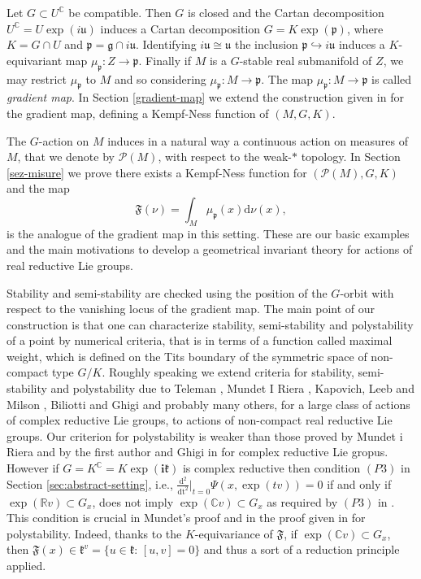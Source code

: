 \documentclass[leqno,11pt, a4]{amsart}
\theoremstyle{named}
\begin{document}
Let $G \subset U^{\mathbb{C}}$ be compatible. Then $G$ is closed and the Cartan decomposition $U^{\mathbb{C}} =U\exp (i {\mathfrak{u}})$ induces a Cartan decomposition $G=K\exp ({\mathfrak{p}})$, where $K=G\cap U$ and ${\mathfrak{p}}={\mathfrak{g}}\cap i {\mathfrak{u}}$.
Identifying $i{\mathfrak{u}} \cong {\mathfrak{u}}$ the inclusion ${\mathfrak{p}} \hookrightarrow i{\mathfrak{u}}$ induces a $K$-equivariant map ${\mu_{\mathfrak{p}}}:Z {\longrightarrow} {\mathfrak{p}}$. Finally if $M$ is a $G$-stable real submanifold of $Z$, we may restrict ${\mu_{\mathfrak{p}}}$ to $M$ and so considering ${\mu_{\mathfrak{p}}}:M {\longrightarrow} {\mathfrak{p}}$. The map ${\mu_{\mathfrak{p}}}:M {\longrightarrow} {\mathfrak{p}}$ is called \emph{gradient map}. In Section \ref{gradient-map} we extend the construction given in \cite{mundet-Crelles}  for the gradient map, defining a Kempf-Ness function of $(M,G,K)$.

The $G$-action on $M$ induces in a natural way a continuous action on measures of $M$, that we denote by $\mathcal P (M)$, with respect to the weak-$\ast$ topology. In Section \ref{sez-misure} we prove there exists a Kempf-Ness function for $(\mathcal P (M),G,K)$ and the map
\[
{\mathfrak{F}} (\nu)=\int_M {\mu_{\mathfrak{p}}}(x) \mathrm d \nu (x),
\]
is the analogue of the gradient map in this setting.
These are our  basic examples and the main motivations  to develop a geometrical invariant theory for actions of real reductive Lie groups.

Stability and semi-stability are checked using the position of the  $G$-orbit with respect to the vanishing locus of the gradient map.
The main point of our construction is that one can characterize stability, semi-stability and polystability of a point by numerical criteria, that is in terms of a function called maximal
weight, which is defined on the Tits boundary of the symmetric space of non-compact type $G/K$.  Roughly speaking we extend criteria for stability, semi-stability and polystability due to Teleman \cite{teleman-symplectic-stability}, Mundet I Riera \cite{mundet-Crelles, mundet-Trans}, Kapovich, Leeb and Milson \cite{kapovich-leeb-millson-convex-JDG}, Biliotti and Ghigi \cite{bgs} and probably many others, for a large class of  actions of complex reductive Lie groups,  to actions of non-compact real reductive Lie groups. Our  criterion for polystability is weaker than those proved by Mundet i Riera \cite{mundet-Trans} and by the first author and Ghigi in \cite{bgs} for complex reductive Lie gropus. However if $G=K^{\mathbb{C}}=K\exp(\mathbf{i} {\mathfrak{k}})$ is complex reductive then condition $(P3)$ in Section \ref{sec:abstract-setting}, i.e.,   $\frac{\mathrm{d^2}}{\mathrm{dt}^2 }\bigg \vert_{t=0}\Psi(x,\exp(t{{v}})) =0$
if and only if $\exp({\mathbb{R}} {{v}}) \subset G_x$, does not imply $\exp ({\mathbb{C}} {{v}}) \subset G_x$ as required by $(P3)$ in \cite[p. 6]{bgs}. 
 This condition is crucial in Mundet's proof \cite{mundet-Trans} and in the proof given in \cite{bgs} for polystability. Indeed, thanks to the $K$-equivariance of  ${\mathfrak{F}}$, if $\exp ({\mathbb{C}} {{v}}) \subset G_x$, then  ${\mathfrak{F}} (x) \in {\mathfrak{k}}^{{v}}=\{u\in {\mathfrak{k}}:\, [u,{{v}}]=0\}$  and thus a sort of a reduction principle applied.
\end{document}
